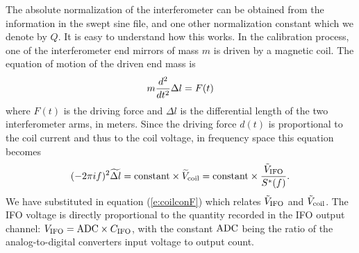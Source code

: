 The absolute normalization of the interferometer can be obtained from
the information in the swept sine file, and one other normalization
constant which we denote by $Q$.  It is easy to understand how this
works.  In the calibration process, one of the interferometer end
mirrors of mass $m$ is driven by a magnetic coil.  The equation of
motion of the driven end mass is
\begin{equation}
m {d^2 \over dt^2} {\Delta l} = F(t)
\end{equation}
where $F(t)$ is the driving force and $\Delta l$ is the differential
length of the two interferometer arms, in meters.  Since the driving
force $d(t)$ is proportional to the coil current and thus to the coil
voltage, in frequency space this equation becomes
\begin{equation}
(- 2 \pi i f)^2 \widetilde{\Delta l}  = {\rm constant} \times \widetilde{V}_{\rm coil} =
{\rm constant} \times {{\tilde V}_{\rm IFO} \over S^*(f)}.
\end{equation}
We have substituted in equation (\ref{e:coilconF}) which relates
${\tilde V}_{\rm IFO}$ and ${\tilde V}_{\rm coil}$.
The IFO voltage is directly proportional to the quantity recorded in 
the IFO output channel: $V_{\rm IFO} = {\rm ADC} \times C_{\rm IFO}$, with the constant ${\rm ADC}$ 
being the ratio of the analog-to-digital converters input voltage to
output count.

